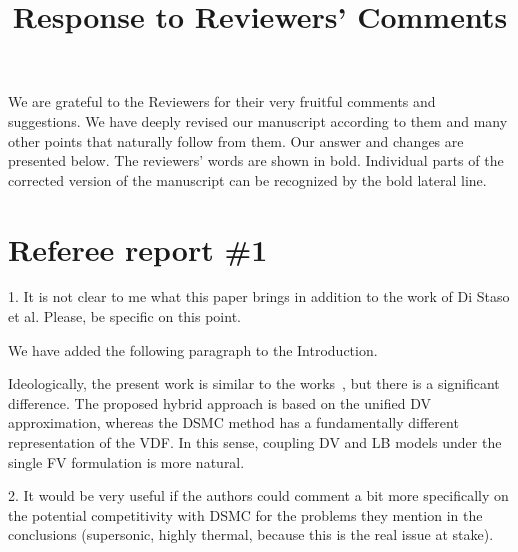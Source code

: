 \documentclass{article}
\title{Response to Reviewers' Comments}
\begin{document}
\maketitle

We are grateful to the Reviewers for their very fruitful comments and suggestions.
We have deeply revised our manuscript according to them and many other points that naturally follow from them.
Our answer and changes are presented below.
The reviewers' words are shown in bold.
Individual parts of the corrected version of the manuscript
can be recognized by the bold lateral line.

\section*{Referee report \#1}

\begin{quoting}
    1. It is not clear to me what this paper brings in addition to the work of Di Staso et al.
    Please, be specific on this point.
\end{quoting}


We have added the following paragraph to the Introduction.

\begin{leftbar}
    Ideologically, the present work is similar to the works~\cite{Staso2016long, Staso2018},
    but there is a significant difference.
    The proposed hybrid approach is based on the unified DV approximation,
    whereas the DSMC method has a fundamentally different representation of the VDF.
    In this sense, coupling DV and LB models under the single FV formulation is more natural.
\end{leftbar}

\begin{quoting}
    2. It would be very useful if the authors could comment a bit more specifically
    on the potential competitivity with DSMC for the problems they mention in the conclusions
    (supersonic, highly thermal, because this is the real issue at stake).
\end{quoting}
\end{document}
